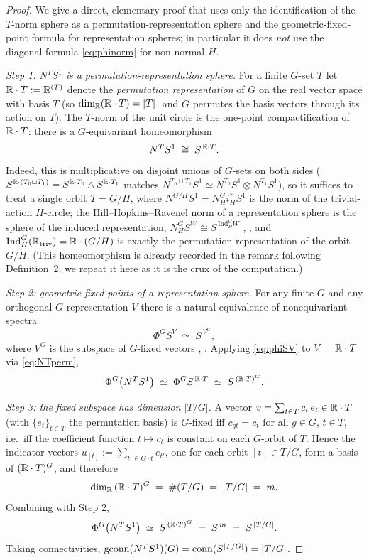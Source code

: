 \begin{proof}
We give a direct, elementary proof that uses only the identification of the
$T$-norm sphere as a permutation-representation sphere and the
geometric-fixed-point formula for representation spheres; in particular it does
\emph{not} use the diagonal formula \eqref{eq:phinorm} for non-normal $H$.

\emph{Step 1: $N^TS^1$ is a permutation-representation sphere.}
For a finite $G$-set $T$ let $\mathbb{R}\cdot T:=\mathbb{R}^{(T)}$ denote the
\emph{permutation representation} of $G$ on the real vector space with basis $T$
(so $\dim_{\mathbb{R}}(\mathbb{R}\cdot T)=|T|$, and $G$ permutes the basis vectors through its
action on $T$). The $T$-norm of the unit circle is the one-point
compactification of $\mathbb{R}\cdot T$: there is a $G$-equivariant homeomorphism
\begin{equation}\label{eq:NTperm}
N^TS^1\;\cong\;S^{\,\mathbb{R}\cdot T}.
\end{equation}
Indeed, this is multiplicative on disjoint unions of $G$-sets on both sides
($S^{\mathbb{R}\cdot(T_0\sqcup T_1)}=S^{\mathbb{R}\cdot T_0}\wedge S^{\mathbb{R}\cdot T_1}$ matches
$N^{T_0\sqcup T_1}S^1\simeq N^{T_0}S^1\otimes N^{T_1}S^1$), so it suffices to
treat a single orbit $T=G/H$, where $N^{G/H}S^1=N^G_H i_H^\ast S^1$ is the
norm of the trivial-action $H$-circle; the Hill--Hopkins--Ravenel norm of a
representation sphere is the sphere of the induced representation,
$N^G_H S^{W}\cong S^{\,\mathrm{Ind}_H^G W}$ \cite[Prop.~B.96]{HHR16},
\cite[\S6]{HillPrimer}, and $\mathrm{Ind}_H^G(\mathbb{R}_{\mathrm{triv}})=\mathbb{R}\cdot(G/H)$
is exactly the permutation representation of the orbit $G/H$. (This homeomorphism
is already recorded in the remark following Definition~2; we repeat it here as it
is the crux of the computation.)

\emph{Step 2: geometric fixed points of a representation sphere.}
For any finite $G$ and any orthogonal $G$-representation $V$ there is a natural
equivalence of nonequivariant spectra
\begin{equation}\label{eq:phiSV}
\Phi^G S^V\;\simeq\;S^{\,V^G},
\end{equation}
where $V^G$ is the subspace of $G$-fixed vectors \cite[\S6]{HillPrimer},
\cite[Prop.~B.96]{HHR16}. Applying \eqref{eq:phiSV} to $V=\mathbb{R}\cdot T$ via
\eqref{eq:NTperm},
\[
\Phi^G\bigl(N^TS^1\bigr)\;\simeq\;\Phi^G S^{\,\mathbb{R}\cdot T}
\;\simeq\;S^{\,(\mathbb{R}\cdot T)^G}.
\]

\emph{Step 3: the fixed subspace has dimension $|T/G|$.}
A vector $v=\sum_{t\in T}c_t\,e_t\in\mathbb{R}\cdot T$ (with $\{e_t\}_{t\in T}$ the
permutation basis) is $G$-fixed iff $c_{gt}=c_t$ for all $g\in G$, $t\in T$,
i.e.\ iff the coefficient function $t\mapsto c_t$ is constant on each $G$-orbit
of $T$. Hence the indicator vectors
$u_{[t]}:=\sum_{t'\in G\cdot t}e_{t'}$, one for each orbit $[t]\in T/G$, form a
basis of $(\mathbb{R}\cdot T)^G$, and therefore
\[
\dim_{\mathbb{R}}\,(\mathbb{R}\cdot T)^G\;=\;\#(T/G)\;=\;|T/G|\;=\;m.
\]
Combining with Step 2,
\[
\Phi^G\bigl(N^TS^1\bigr)\;\simeq\;S^{\,(\mathbb{R}\cdot T)^G}\;=\;S^{\,m}
\;=\;S^{\,|T/G|}.
\]
Taking connectivities,
$\operatorname{gconn}(N^TS^1)(G)=\operatorname{conn}(S^{|T/G|})=|T/G|$.
\end{proof}

